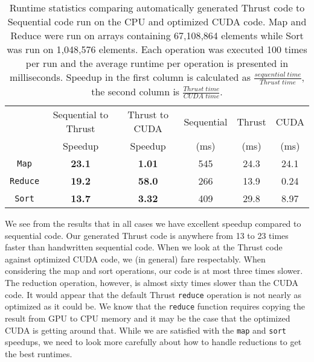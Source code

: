 \documentclass[twocolumn]{article}
\renewcommand{\|}{\origbar} %
\newcommand{\code}[1]{\texttt{#1}}
\begin{document}
\begin{table*}
  \centering
\begin{tabular}{| c || c|c || c|c|c |}
  \hline
                 & Sequential to Thrust & Thrust to CUDA & Sequential & Thrust & CUDA \\
                 &       Speedup                   &       Speedup             &    (ms)   &  (ms) & (ms) \\ \hline \hline
  \code{Map}     &  {\bf 23.1}                     & {\bf 1.01}                & 545       & 24.3  & 24.1 \\
  \code{Reduce}  &  {\bf 19.2}                     & {\bf 58.0}                & 266       & 13.9  & 0.24 \\
  \code{Sort}    &  {\bf 13.7}                     & {\bf 3.32}                & 409       & 29.8  & 8.97 \\ \hline
\end{tabular}
\caption{Runtime statistics comparing automatically generated Thrust code to Sequential code run on the CPU and optimized CUDA code. Map and Reduce were run on arrays containing 67,108,864 elements while Sort was run on 1,048,576 elements. Each operation was executed 100 times per run and the average runtime per operation is presented in milliseconds. Speedup in the first column is calculated as $\frac{sequential\; time}{Thrust\; time}$, the second column is $\frac{Thrust\; time}{CUDA\; time}$.}
\label{table:runtimes}
\end{table*}

We see from the results that in all cases we have excellent speedup compared to sequential code. Our generated Thrust code is anywhere from 13 to 23 times faster than handwritten sequential code. When we look at the Thrust code against optimized CUDA code, we (in general) fare respectably. When considering the map and sort operations, our code is at most three times slower. The reduction operation, however, is almost sixty times slower than the CUDA code. It would appear that the default Thrust \code{reduce} operation is not nearly as optimized as it could be. We know that the \code{reduce} function requires copying the result from GPU to CPU memory and it may be the case that the optimized CUDA is getting around that. While we are satisfied with the \code{map} and \code{sort} speedups, we need to look more carefully about how to handle reductions to get the best runtimes. 
\end{document}
